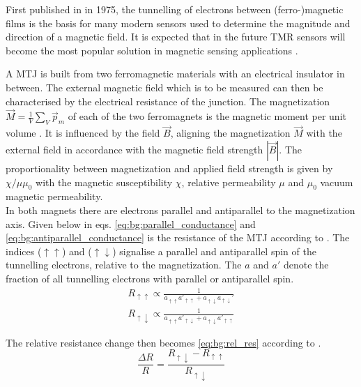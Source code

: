 First published in \parencite{JULLIERE1975} in 1975, the tunnelling of electrons between (ferro-)magnetic films is the basis for many modern sensors used to determine the magnitude and direction of a magnetic field. It is expected that in the future \ac{TMR} sensors will become the most popular solution in magnetic sensing applications \parencite{yan2022}.

A \ac{MTJ} is built from two ferromagnetic materials with an electrical insulator in between. The external magnetic field which is to be measured can then be characterised by the electrical resistance of the junction. The magnetization $\vec{M}=\frac1V\sum_V\vec{p}_m$ of each of the two ferromagnets is the magnetic moment per unit volume \parencite{Demtröder2017-eo}. It is influenced by the field $\vec{B}$, aligning the magnetization $\vec{M}$ with the external field in accordance with the magnetic field strength $
|\vec{B}|$. The proportionality between magnetization and applied field strength is given by $\chi/\mu\mu_0$ with the magnetic susceptibility $\chi$, relative permeability $\mu$ and $\mu_0$ vacuum magnetic permeability.\\
In both magnets there are electrons parallel and antiparallel to the magnetization axis. Given below in eqs. \eqref{eq:bg:parallel_conductance} and \eqref{eq:bg:antiparallel_conductance} is the resistance of the \ac{MTJ} according to \parencite{JULLIERE1975}. The indices ($\uparrow\uparrow$) and ($\uparrow\downarrow$) signalise a parallel and antiparallel spin of the tunnelling electrons, relative to the magnetization. The $a$ and $a'$ denote the fraction of all tunnelling electrons with parallel or antiparallel spin.
\begin{align}
    R_{\uparrow\uparrow}\propto \frac{1}{a^{}_{\uparrow\uparrow}a'_{\uparrow\uparrow}+a^{}_{\uparrow\downarrow}a_{\uparrow\downarrow}'}
    \label{eq:bg:parallel_conductance} \\
     R_{\uparrow\downarrow}\propto \frac{1}{a^{}_{\uparrow\uparrow}a'_{\uparrow\downarrow}+a^{}_{\uparrow\downarrow}a'_{\uparrow\uparrow}}
     \label{eq:bg:antiparallel_conductance}
\end{align}

The relative resistance change then becomes \eqref{eq:bg:rel_res} according to \parencite{moodera1995}.
\begin{equation}
    \frac{\Delta R}{R}=\frac{R_{\uparrow\downarrow} - R_{\uparrow\uparrow}}{R_{\uparrow\downarrow}}
    \label{eq:bg:rel_res}
\end{equation}


